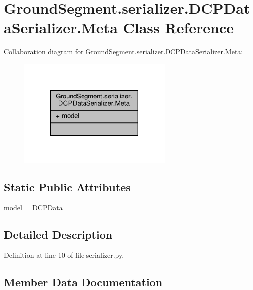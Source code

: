 \hypertarget{class_ground_segment_1_1serializer_1_1_d_c_p_data_serializer_1_1_meta}{}\section{Ground\+Segment.\+serializer.\+D\+C\+P\+Data\+Serializer.\+Meta Class Reference}
\label{class_ground_segment_1_1serializer_1_1_d_c_p_data_serializer_1_1_meta}


Collaboration diagram for Ground\+Segment.\+serializer.\+D\+C\+P\+Data\+Serializer.\+Meta\+:\nopagebreak
\begin{figure}[H]
\begin{center}
\leavevmode
\includegraphics[width=212pt]{class_ground_segment_1_1serializer_1_1_d_c_p_data_serializer_1_1_meta__coll__graph}
\end{center}
\end{figure}
\subsection*{Static Public Attributes}
\begin{DoxyCompactItemize}
\item 
\hyperlink{class_ground_segment_1_1serializer_1_1_d_c_p_data_serializer_1_1_meta_ac5063805bbf442fa667da549a90df5b5}{model} = \hyperlink{class_ground_segment_1_1models_1_1_d_c_p_data_1_1_d_c_p_data}{D\+C\+P\+Data}
\end{DoxyCompactItemize}


\subsection{Detailed Description}


Definition at line 10 of file serializer.\+py.



\subsection{Member Data Documentation}
\hypertarget{class_ground_segment_1_1serializer_1_1_d_c_p_data_serializer_1_1_meta_ac5063805bbf442fa667da549a90df5b5}{}
